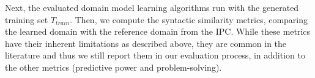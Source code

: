 \documentclass{article}
\theoremstyle{definition}
\theoremstyle{remark}
\newcommand{\tuple}[1]{\ensuremath{\left \langle #1 \right \rangle }}
\newcommand{\T}{T}
\newcommand{\Ttrain}{\T_{train}}
\newif\ifaddcomments
\newcommand{\roni}[1]{\ifaddcomments{\textcolor{red}{[Roni: #1]}}\fi}
\newcommand{\argaman}[1]{\ifaddcomments{\textcolor{blue}{[Argaman: #1]}}\fi}
\newcommand{\leo}[1]{\ifaddcomments{\textcolor{pink}{[Leonardo: #1]}}\fi}
\begin{document}
%
%

%

Next, the evaluated domain model learning algorithms run with the generated training set $\Ttrain$. Then, we compute the syntactic similarity metrics, comparing the learned domain with the reference domain from the IPC. 
While these metrics have their inherent limitations as described above, they are common in the literature and thus we still report them in our evaluation process, in addition to the other metrics (predictive power and problem-solving). 
\end{document}
